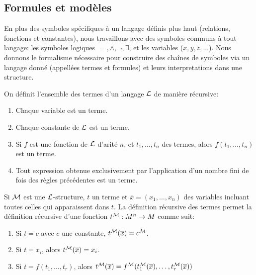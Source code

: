 \subsection{Formules et modèles}

En plus des symboles spécifiques à un langage définis plus haut (relations,
fonctions et constantes), nous travaillons avec des symboles communs à tout langage:
les symboles logiques $=,\wedge, \neg, \exists$, et les variables
($x,y,z,\ldots$). Nous donnons le formalisme nécessaire pour construire des chaînes de symboles 
via un langage donné (appellées termes et formules) et leurs interpretations dans une structure.

\begin{defi}[Terme]\label{defi-terme}
On définit l'ensemble des termes d'un langage $\mathcal{L}$ de manière récursive:
\begin{enumerate}[label= (\roman*)]
    \item Chaque variable est un terme.
    \item Chaque constante de $\mathcal{L}$ est un terme.
    \item Si $f$ est une fonction de $\mathcal{L}$ d'arité $n$, et $t_1, \ldots, t_n$
    des termes, alors $f(t_1,\ldots, t_n)$ est un terme.
    \item Tout expression obtenue exclusivement par l'application d'un nombre
    fini de fois des règles précédentes est un terme.
\end{enumerate}

Si $\mathcal{M}$ est une $\mathcal{L}$-structure, $t$ un terme et $\overline{x} = (x_1, \ldots,
x_n)$ des variables incluant toutes celles qui apparaissent dans $t$. La
définition récursive des termes permet la définition récursive d'une fonction
$t^{\mathcal{M}} : M^n \rightarrow M$ comme suit:
\begin{enumerate}[label= (\roman*)]
    \item Si $t=c$ avec $c$ une constante, $t^{\mathcal{M}}(\overline{x}) = c^{\mathcal{M}}$.
    \item Si $t=x_i$, alors $t^{\mathcal{M}}(\overline{x}) = x_i$.
    \item Si $t=f(t_1, \ldots, t_r)$, alors $t^{\mathcal{M}}(\overline{x}) =
    f^{\mathcal{M}}(t_1^{\mathcal{M}}(\overline{x}),\ldots, t_r^{\mathcal{M}}(\overline{x}))$
\end{enumerate}
\end{defi}

